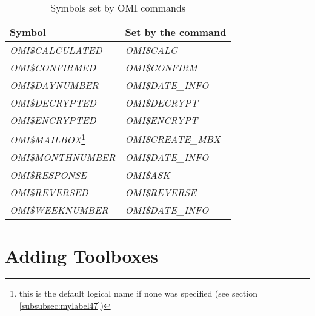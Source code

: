 \documentclass[a4paper]{book}
\begin{document}
\begin{table}[ht]
\begin{minipage}[t]{\textwidth}
\begin{tabular}{ll} \hline
\textbf{Symbol} & \textbf{Set by the command}\\ \hline
\textsl{OMI{\$}CALCULATED}\index{OMI{\$}CALCULATED}\index{OMI symbols!global symbols!OMI{\$}CALCULATED} & \textsl{OMI{\$}CALC} \\
\textsl{OMI{\$}CONFIRMED}\index{OMI{\$}CONFIRMED}\index{OMI symbols!global symbols!OMI{\$}CONFIRMED} & \textsl{OMI{\$}CONFIRM} \\
\textsl{OMI{\$}DAYNUMBER}\index{OMI{\$}DAYNUMBER}\index{OMI symbols!global symbols!OMI{\$}DAYNUMBER} & \textsl{OMI{\$}DATE{\_}INFO} \\
\textsl{OMI{\$}DECRYPTED}\index{OMI{\$}DECRYPTED}\index{OMI symbols!global symbols!OMI{\$}DECRYPTED} & \textsl{OMI{\$}DECRYPT} \\
\textsl{OMI{\$}ENCRYPTED}\index{OMI{\$}ENCRYPTED}\index{OMI symbols!global symbols!OMI{\$}ENCRYPTED} & \textsl{OMI{\$}ENCRYPT} \\
\textsl{OMI{\$}MAILBOX}\footnote{ this is the default logical name if none was specified (see section \ref{subsubsec:mylabel47})}\index{OMI{\$}MAILBOX}\index{OMI symbols!global symbols!OMI{\$}MAILBOX} & \textsl{OMI{\$}CREATE{\_}MBX} \\
\textsl{OMI{\$}MONTHNUMBER}\index{OMI{\$}MONTHNUMBER}\index{OMI symbols!global symbols!OMI{\$}MONTHNUMBER} & \textsl{OMI{\$}DATE{\_}INFO} \\
\textsl{OMI{\$}RESPONSE}\index{OMI{\$}RESPONSE}\index{OMI symbols!global symbols!OMI{\$}RESPONSE} & \textsl{OMI{\$}ASK} \\
\textsl{OMI{\$}REVERSED}\index{OMI{\$}REVERSED}\index{OMI symbols!global symbols!OMI{\$}REVERSED} & \textsl{OMI{\$}REVERSE} \\
\textsl{OMI{\$}WEEKNUMBER}\index{OMI{\$}WEEKNUMBER}\index{OMI symbols!global symbols!OMI{\$}WEEKNUMBER} & \textsl{OMI{\$}DATE{\_}INFO} \\
\hline
\end{tabular}
\caption{Symbols set by OMI commands}\label{tab:globsymbols}
\end{minipage}
\end{table}

\chapter{Adding Toolboxes}
\label{sec:adding}
\end{document}
